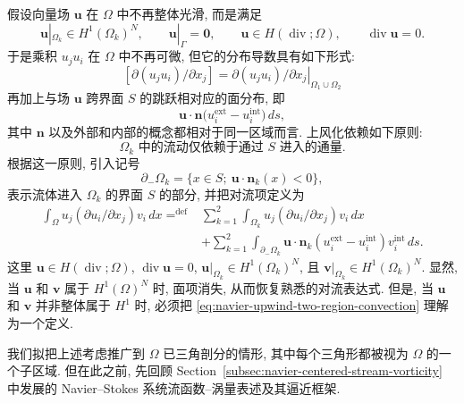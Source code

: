 假设向量场 $\boldsymbol u$ 在 $\Omega$ 中不再整体光滑, 而是满足
\[
\boldsymbol u|_{\Omega_k}\in H^1(\Omega_k)^N,
\qquad \boldsymbol u|_\Gamma=\boldsymbol0,
\qquad \boldsymbol u\in H(\operatorname{div};\Omega),
\qquad \operatorname{div}\boldsymbol u=0.
\]
于是乘积 $u_ju_i$ 在 $\Omega$ 中不再可微, 但它的分布导数具有如下形式:
\[
[\partial(u_ju_i)/\partial x_j]
=\left.\partial(u_ju_i)/\partial x_j\right|_{\Omega_1\cup\Omega_2}
\]
再加上与场 $\boldsymbol u$ 跨界面 $S$ 的跳跃相对应的面分布, 即
\[
\boldsymbol u\cdot\boldsymbol n
\bigl(u_i^{\mathrm{ext}}-u_i^{\mathrm{int}}\bigr)\,ds,
\]
其中 $\boldsymbol n$ 以及外部和内部的概念都相对于同一区域而言. 上风化依赖如下原则:
\[
\textit{$\Omega_k$ 中的流动仅依赖于通过 $S$ 进入的通量.}
\]
根据这一原则, 引入记号
\begin{equation}\label{eq:navier-upwind-inflow-interface}
\partial_-\Omega_k
=\{x\in S;\ \boldsymbol u\cdot\boldsymbol n_k(x)<0\},
\end{equation}
表示流体进入 $\Omega_k$ 的界面 $S$ 的部分, 并把对流项定义为
\begin{equation}\label{eq:navier-upwind-two-region-convection}
\begin{aligned}
\int_\Omega u_j(\partial u_i/\partial x_j)v_i\,dx
\mathrel{\mathop{=}^{\mathrm{def}}}
&\sum_{k=1}^2\int_{\Omega_k}u_j(\partial u_i/\partial x_j)v_i\,dx\\
&+\sum_{k=1}^2\int_{\partial_-\Omega_k}
\boldsymbol u\cdot\boldsymbol n_k
(u_i^{\mathrm{ext}}-u_i^{\mathrm{int}})v_i^{\mathrm{int}}\,ds.
\end{aligned}
\end{equation}
这里 $\boldsymbol u\in H(\operatorname{div};\Omega)$,
$\operatorname{div}\boldsymbol u=0$,
$\boldsymbol u|_{\Omega_k}\in H^1(\Omega_k)^N$, 且
$\boldsymbol v|_{\Omega_k}\in H^1(\Omega_k)^N$.
显然, 当 $\boldsymbol u$ 和 $\boldsymbol v$ 属于 $H^1(\Omega)^N$ 时, 面项消失,
从而恢复熟悉的对流表达式. 但是, 当 $\boldsymbol u$ 和 $\boldsymbol v$ 并非整体属于
$H^1$ 时, 必须把 \eqref{eq:navier-upwind-two-region-convection} 理解为一个定义.

我们拟把上述考虑推广到 $\Omega$ 已三角剖分的情形, 其中每个三角形都被视为
$\Omega$ 的一个子区域. 但在此之前, 先回顾 Section~\ref{subsec:navier-centered-stream-vorticity}
中发展的 Navier--Stokes 系统流函数--涡量表述及其逼近框架.


